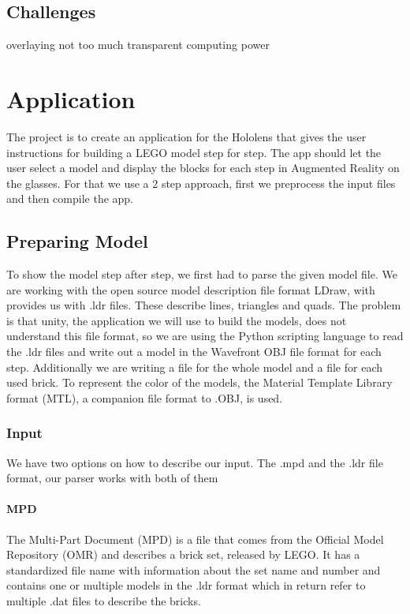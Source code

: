 \documentclass[11pt,a4paper]{article}
\begin{document}
	\subsection{Challenges}
	overlaying
	not too much
	transparent
	computing power

\section{Application}

	The project is to create an application for the Hololens that gives the user instructions for building a LEGO model step for step. The app should let the user select a model and display the blocks for each step in Augmented Reality on the glasses.
	For that we use a 2 step approach, first we preprocess the input files and then compile the app.

	\subsection{Preparing Model}
	
	To show the model step after step, we first had to parse the given model file. We are working with the open source model description file format LDraw, with provides us with .ldr files. These describe lines, triangles and quads. The problem is that unity, the application we will use to build the models, does not understand this file format, so we are using the Python scripting language to read the .ldr files and write out a model in the Wavefront OBJ file format for each step. Additionally we are writing a file for the whole model and a file for each used brick. To represent the color of the models, the Material Template Library format (MTL), a companion file format to .OBJ, is used.
	
	\subsubsection{Input}
	We have two options on how to describe our input. The .mpd and the .ldr file format, our parser works with both of them

	\paragraph{MPD}
	The Multi-Part Document (MPD) is a file that comes from the Official Model Repository (OMR)  and describes a brick set, released by LEGO. It has a standardized file name with information about the set name and number and contains one or multiple models in the .ldr format which in return refer to multiple .dat files to describe the bricks.
\end{document}
